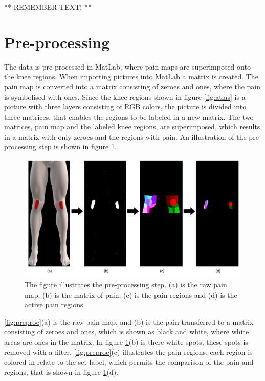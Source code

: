 ** REMEMBER TEXT! **

\section{Pre-processing}

The data is pre-processed in MatLab, where pain maps are superimposed onto the knee regions. When importing pictures into MatLab a matrix is created. The pain map is converted into a matrix consisting of zeroes and ones, where the pain is symbolised with ones.  
Since the knee regions shown in figure \ref{fig:atlas} is a picture with three layers consisting of RGB colors, the picture is divided into three matrices, that enables the regions to be labeled in a new matrix. The two matrices, pain map and the labeled knee regions, are superimposed, which results in a matrix with only zeroes and the regions with pain. 
An illustration of the pre-processing step is shown in figure \ref{fig:preproc}.

\begin{figure} [H]
\centering
\includegraphics[width=1\textwidth]{figures/preprocessing}
\caption{The figure illustrates the pre-processing step. (a) is the raw pain map, (b) is the matrix of pain, (c) is the pain regions and (d) is the active pain regions.}
\label{fig:preproc}
\end{figure}

\noindent
\autoref{fig:preproc}(a) is the raw pain map, and (b) is the pain transferred to a matrix consisting of zeroes and ones, which is shown as black and white, where white areas are ones in the matrix. In figure \ref{fig:preproc}(b) is there white spots, these spots is removed with a filter. \autoref{fig:preproc}(c) illustrates the pain regions, each region is colored in relate to the set label, which permits the comparison of the pain and regions, that is shown in figure \ref{fig:preproc}(d).  
